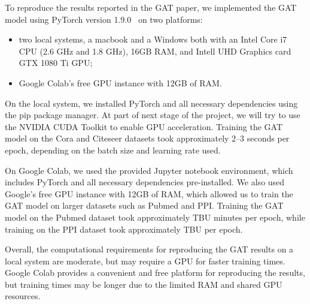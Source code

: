 To reproduce the results reported in the GAT paper, we implemented the GAT model using PyTorch version 1.9.0~\cite{paszke2019pytorch} on two platforms:
\begin{itemize}
    \item two local systems, a macbook and a Windows both with an Intel Core i7 CPU (2.6 GHz and 1.8 GHz), 16GB RAM,
    and Intell UHD Graphics
    card
    GTX 1080
    Ti GPU;
    \item Google Colab's free GPU instance with 12GB of RAM\@.
\end{itemize}

On the local system, we installed PyTorch and all necessary dependencies using the pip package manager.
At part of next stage of the project, we will try to use the NVIDIA CUDA Toolkit to enable GPU acceleration.
Training the GAT model on the Cora and Citeseer datasets took approximately 2--3 seconds per epoch, depending on the
batch size and learning rate used.

On Google Colab, we used the provided Jupyter notebook environment, which includes PyTorch and all necessary dependencies pre-installed.
We also used Google's free GPU instance with 12GB of RAM, which allowed us to train the GAT model on larger datasets such as Pubmed and PPI.
Training the GAT model on the Pubmed dataset took approximately TBU minutes per epoch, while training on the PPI
dataset took approximately TBU per epoch.

Overall, the computational requirements for reproducing the GAT results on a local system are moderate, but may require a GPU for faster training times.
Google Colab provides a convenient and free platform for reproducing the results, but training times may be longer due to the limited RAM and shared GPU resources.
